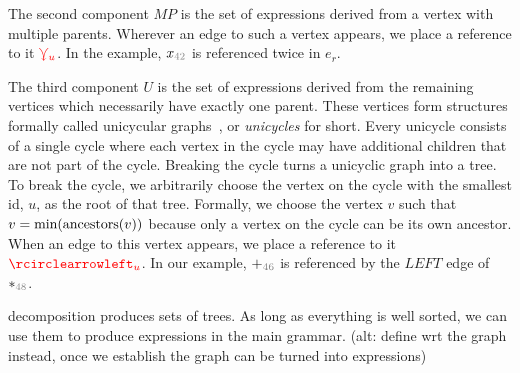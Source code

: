 
The second component $MP$ is the set of expressions derived from a vertex with multiple parents.
Wherever an edge to such a vertex appears, we place a reference to it $\textcolor{red}{\curlyveedownarrow_{u}}$.
In the example, $x_{\id{42}}$ is referenced twice in $e_r$.

The third component $U$ is the set of expressions derived from the remaining vertices which necessarily have exactly one parent.
These vertices form structures formally called unicycular graphs~\citep{DBLP:journals/algorithmica/KruskalRS90}, or \emph{unicycles} for short.
Every unicycle consists of a single cycle where each vertex in the cycle may have additional children that are not part of the cycle.
Breaking the cycle turns a unicyclic graph into a tree.
To break the cycle, we arbitrarily choose the vertex on the cycle with the smallest id, $u$, as the root of that tree.
Formally, we choose the vertex $v$ such that $v = \operatorname{\text{min}}\mathopen{}\left(\operatorname{\text{ancestors}}\mathopen{}\left(v\right)\mathclose{}\right)\mathclose{}$ because
only a vertex on the cycle can be its own ancestor.
When an edge to this vertex appears, we place a reference to it $\cycleVertex{u}$.
In our example, ${+}_{\id{46}}$ is referenced by the $LEFT$ edge of ${*}_{\id{48}}$.


decomposition produces sets of trees. As long as everything is well sorted, we
can use them to produce expressions in the main grammar. (alt: define wrt the
graph instead, once we establish the graph can be turned into expressions)

